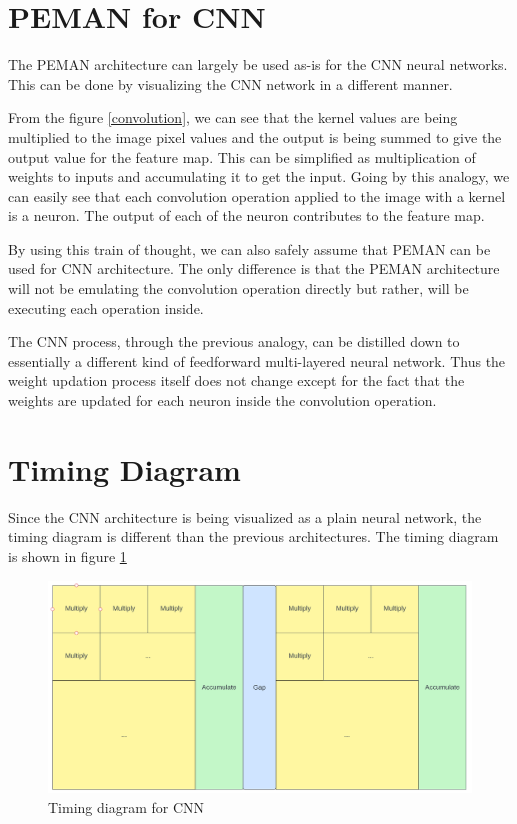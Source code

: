 \section{PEMAN for CNN}

The PEMAN architecture can largely be used as-is for the CNN neural networks. This can be done by visualizing the CNN network in a different manner.

From the figure \ref{convolution}, we can see that the kernel values are being multiplied to the image pixel values and the output is being summed to give the output value for the feature map. This can be simplified as multiplication of weights to inputs and accumulating it to get the input. Going by this analogy, we can easily see that each convolution operation applied to the image with a kernel is a neuron. The output of each of the neuron contributes to the feature map.

By using this train of thought, we can also safely assume that PEMAN can be used for CNN architecture. The only difference is that the PEMAN architecture will not be emulating the convolution operation directly but rather, will be executing each operation inside.

The CNN process, through the previous analogy, can be distilled down to essentially a different kind of feedforward multi-layered neural network. Thus the weight updation process itself does not change except for the fact that the weights are updated for each neuron inside the convolution operation.

\section{Timing Diagram}

Since the CNN architecture is being visualized as a plain neural network, the timing diagram is different than the previous architectures. The timing diagram is shown in figure \ref{cnn_timing}

\begin{figure}
	\centering
	\includegraphics[width=\textwidth]{images/convtiming.png}
	\caption{Timing diagram for CNN}
	\label{cnn_timing}
\end{figure}

